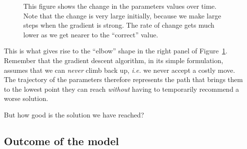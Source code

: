 \documentclass[
  letterpaper,
]{scrbook}
\begin{document}
\begin{figure}[pbt]


\caption{\label{fig-gradient-param-change}This figure shows the change
in the parameters values over time. Note that the change is very large
initially, because we make large steps when the gradient is strong. The
rate of change gets much lower as we get nearer to the ``correct''
value.}

\end{figure}%

This is what gives rise to the ``elbow'' shape in the right panel of
Figure~\ref{fig-gradient-param-change}. Remember that the gradient
descent algorithm, in its simple formulation, assumes that we can
\emph{never} climb back up, \emph{i.e.} we never accept a costly move.
The trajectory of the parameters therefore represents the path that
brings them to the lowest point they can reach \emph{without} having to
temporarily recommend a worse solution.

But how good is the solution we have reached?

\subsection{Outcome of the model}\label{outcome-of-the-model}
\end{document}
